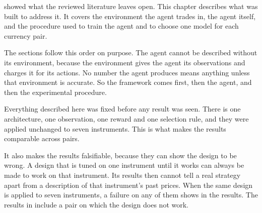 \label{Chapter:Implementation}

 showed what the reviewed literature leaves open. This chapter describes what was built to address it. It covers the environment the agent trades in, the agent itself, and the procedure used to train the agent and to choose one model for each currency pair.

The sections follow this order on purpose. The agent cannot be described without its environment, because the environment gives the agent its observations and charges it for its actions. No number the agent produces means anything unless that environment is accurate. So the framework comes first, then the agent, and then the experimental procedure.







Everything described here was fixed before any result was seen. There is one architecture, one observation, one reward and one selection rule, and they were applied unchanged to seven instruments. This is what makes the results comparable across pairs.

It also makes the results falsifiable, because they can show the design to be wrong. A design that is tuned on one instrument until it works can always be made to work on that instrument. Its results then cannot tell a real strategy apart from a description of that instrument's past prices. When the same design is applied to seven instruments, a failure on any of them shows in the results. The results in  include a pair on which the design does not work.